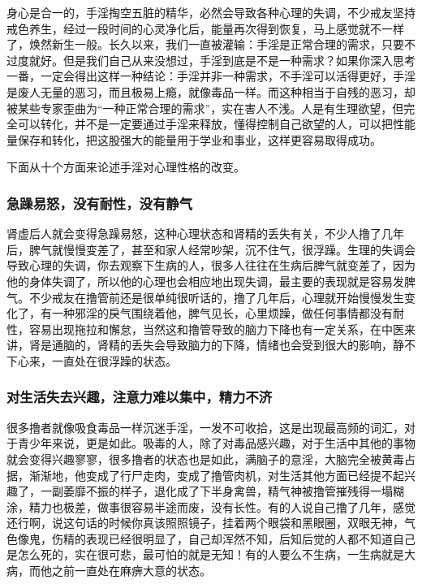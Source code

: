 身心是合一的，手淫掏空五脏的精华，必然会导致各种心理的失调，不少戒友坚持戒色养生，经过一段时间的心灵净化后，能量再次得到恢复，马上感觉就不一样了，焕然新生一般。长久以来，我们一直被灌输：手淫是正常合理的需求，只要不过度就好。但是我们自己从来没想过，手淫到底是不是一种需求？如果你深入思考一番，一定会得出这样一种结论：手淫并非一种需求，不手淫可以活得更好，手淫是废人无量的恶习，而且极易上瘾，就像毒品一样。而这种相当于自残的恶习，却被某些专家歪曲为“一种正常合理的需求”，实在害人不浅。人是有生理欲望，但完全可以转化，并不是一定要通过手淫来释放，懂得控制自己欲望的人，可以把性能量保存和转化，把这股强大的能量用于学业和事业，这样更容易取得成功。

下面从十个方面来论述手淫对心理性格的改变。

\subsubsection{急躁易怒，没有耐性，没有静气}

肾虚后人就会变得急躁易怒，这种心理状态和肾精的丢失有关，不少人撸了几年后，脾气就慢慢变差了，甚至和家人经常吵架，沉不住气，很浮躁。生理的失调会导致心理的失调，你去观察下生病的人，很多人往往在生病后脾气就变差了，因为他的身体失调了，所以他的心理也会相应地出现失调，最主要的表现就是容易发脾气。不少戒友在撸管前还是很单纯很听话的，撸了几年后，心理就开始慢慢发生变化了，有一种邪淫的戾气围绕着他，脾气见长，心里烦躁，做任何事情都没有耐性，容易出现拖拉和懈怠，当然这和撸管导致的脑力下降也有一定关系，在中医来讲，肾是通脑的，肾精的丢失会导致脑力的下降，情绪也会受到很大的影响，静不下心来，一直处在很浮躁的状态。

\subsubsection{对生活失去兴趣，注意力难以集中，精力不济}

很多撸者就像吸食毒品一样沉迷手淫，一发不可收拾，这是出现最高频的词汇，对于青少年来说，更是如此。吸毒的人，除了对毒品感兴趣，对于生活中其他的事物就会变得兴趣寥寥，很多撸者的状态也是如此，满脑子的意淫，大脑完全被黄毒占据，渐渐地，他变成了行尸走肉，变成了撸管肉机，对生活其他方面已经提不起兴趣了，一副萎靡不振的样子，退化成了下半身禽兽，精气神被撸管摧残得一塌糊涂，精力也极差，做事很容易半途而废，没有长性。有的人说自己撸了几年，感觉还行啊，说这句话的时候你真该照照镜子，挂着两个眼袋和黑眼圈，双眼无神，气色像鬼，伤精的表现已经很明显了，自己却浑然不知，后知后觉的人都不知道自己是怎么死的，实在很可悲，最可怕的就是无知！有的人要么不生病，一生病就是大病，而他之前一直处在麻痹大意的状态。

